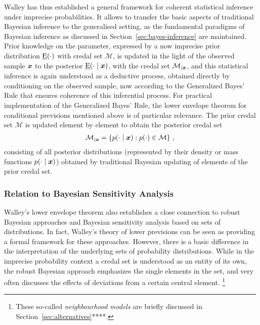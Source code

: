 Walley has thus established a general framework for coherent statistical inference under imprecise probabilities.
It allows to transfer the basic aspects of traditional Bayesian inference to the generalised setting,
as the fundamental paradigms of Bayesian inference as discussed in Section~\ref{sec:bayes-inference} are maintained.
Prior knowledge on the parameter, expressed by a now imprecise prior distribution $\underline{\operatorname{E}}(\cdot)$ with credal set $\mathcal{M}$,
is updated in the light of the observed sample ${\bm x}$ to the posterior $\underline{\operatorname{E}}(\cdot \mid {\bm x})$,
with the credal set $\mathcal{M}_{\vert {\bm x}}$,
and this statistical inference is again understood as a deductive process,
obtained directly by conditioning on the observed sample,
now according to the Generalized Bayes' Rule that ensures coherence of this inferential process.
For practical implementation of the Generalized Bayes' Rule, the lower envelope theorem for conditional 
previsions mentioned above %
is of particular relevance.
The prior credal set $\mathcal{M}$ is updated element by element to obtain the posterior credal set %
\begin{align}
\label{eq:posteriorcredalset}
\mathcal{M}_{\vert {\bm x}} = \left\{ p(\cdot \mid {\bm x}) :  p(\cdot) \in \mathcal{M} \right\}\,,
\end{align}
consisting of all posterior distributions (represented by their density or mass functions $p(\cdot \mid {\bm x})$)
obtained by traditional Bayesian updating of elements of the prior credal set.

\subsubsection{Relation to Bayesian Sensitivity Analysis}

Walley's lower envelope theorem also establishes a close connection to robust Bayesian approaches and Bayesian sensitivity analysis
\parencite[see, e.g.,][]{1994:berger, 2000:rios, 2005:ruggeri} based on sets of distributions.
In fact, Walley's theory of lower previsions can be seen as
providing a formal framework for these approaches.
However, there is a basic difference in the interpretation of the underlying sets of probability distributions.
While in the imprecise probability context a credal set is understood as an entity of its own,
the robust Bayesian approach emphasizes the single elements in the set,
and very often discusses the effects of deviations from a certain central element.%
\footnote{These so-called \emph{neighbourhood models} are briefly discussed in Section~\ref{sec:alternatives}****.}

